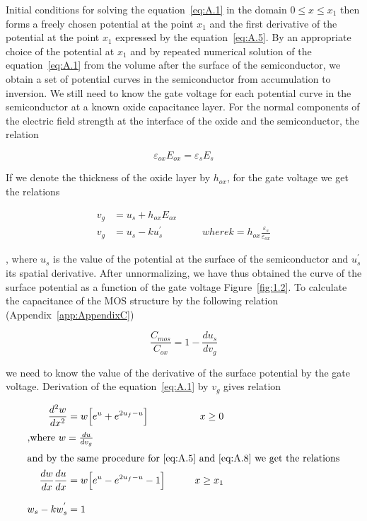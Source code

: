 Initial conditions for solving the equation~\ref{eq:A.1} in the domain
${0\leq{x}\leq{x_1}}$ then forms a freely chosen potential at the
point $x_1$ and the first derivative of the potential at the point
$x_1$ expressed by the equation~\ref{eq:A.5}. By an appropriate choice
of the potential at $x_1$ and by repeated numerical solution of the
equation~\ref{eq:A.1} from the volume after the surface of the
semiconductor, we obtain a set of potential curves in the
semiconductor from accumulation to inversion. We still need to know
the gate voltage for each potential curve in the semiconductor at a
known oxide capacitance layer.  For the normal components of the
electric field strength at the interface of the oxide and the
semiconductor, the relation

\begin{equation}\label{eq:A.6}
  \varepsilon_{ox}E_{ox} = \varepsilon_s{E_s}
\end{equation}

If we denote the thickness of the oxide layer by $h_{ox}$, for the
gate voltage we get the relations

\begin{align}
  v_g &= u_s + h_{ox}E_{ox} \label{eq:A.7} \\
  v_g &= u_s - ku_{s}^{'} \qquad\qquad where {k = h_{ox}\frac{\varepsilon_s}{\varepsilon_{ox}}} \label{eq:A.8}
\end{align}

, where $u_s$ is the value of the potential at the surface of the
semiconductor and $u_{s}^{'}$ its spatial derivative. After
unnormalizing, we have thus obtained the curve of the surface
potential as a function of the gate voltage Figure~\ref{fig:1.2}. To
calculate the capacitance of the MOS structure by the following
relation (Appendix~\ref{app:AppendixC})

\begin{equation}\label{eq:A.9}
  \frac{C_{mos}}{C_{ox}} = 1 - \frac{du_s}{dv_g}
\end{equation}

we need to know the value of the derivative of the surface potential
by the gate voltage. Derivation of the equation~\ref{eq:A.1} by $v_g$
gives relation

\begin{samepage}
  \begin{subequations}\label{eq:A.10}
    \begin{align}
      \frac{d^{2}w}{dx^2} &= w \Big[e^u + e^{2u_f-u}\Big] \qquad &{x\ge{0}} \label{eq:A.10a} \\
      \intertext{,where $w=\frac{du}{dv_g}$}
      \intertext{and by the same procedure for~\ref{eq:A.5} and~\ref{eq:A.8} we get the relations}
      \frac{dw}{dx}\frac{du}{dx} &= w \Big[e^u - e^{2u_f-u} - 1\Big] \qquad &{x\ge{x_1}} \label{eq:A.10b} \\[0.3cm]
      w_s - kw_s^{'} &= 1 \label{eq:A.10c}
    \end{align}
  \end{subequations}
\end{samepage}

